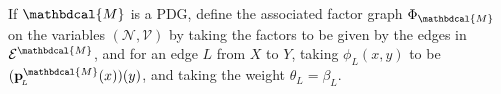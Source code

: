 \documentclass{article}
\theoremstyle{plain}
\theoremstyle{definition}
\theoremstyle{remark}
\newcommand\mat[1]{\mathbf{#1}}
\newcommand{\bp}[1][L]{\mat{p}_{\!_{#1}\!}}
\newcommand{\V}{\mathcal V}
\newcommand{\N}{\mathcal N}
\newcommand{\Ed}{\mathcal E}
\newcommand{\pdgvars}[1][]{(\N#1, \Ed#1, \V#1, \mat p#1, \beta#1)}
\newcommand{\dg}[1]{\mathbdcal{#1}}
\newcommand{\ed}[3]{#2
  \overset{\smash{\mskip-5mu\raisebox{-1pt}{$\scriptscriptstyle
        #1$}}}{\rightarrow} #3}
\numberwithin{equation}{section}
\begin{document}
\begin{defn}\label{def:PDG2fg}
  If $\dg M$ is a PDG, define   
the associated factor graph $\Phi_{\dg M}$ on the	
variables $(\N,\V)$ by
taking the factors to be given by the edges in $\Ed^{\dg M}$, and for an
edge $L$ from $X$ to $Y$, taking $\phi_L(x,y)$ to be $(\bp^{\dg
  M}(x))(y)$, and taking the weight $\theta_L = \beta_L$.
\end{defn}
\end{document}
